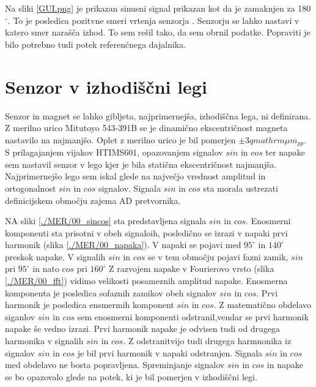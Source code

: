Na sliki  \ref{GUI.png} je prikazan sinusni signal prikazan kot da je zamaknjen za 180$\mathrm{^\circ}$. To je posledica pozitvne smeri vrtenja senzorja \cite{RM44}. Senzorju se lahko nastavi v katero smer narašča izhod. To sem rešil tako, da sem obrnil podatke. Popraviti je bilo potrebno tudi potek referenčnega dajalnika.
\section{Senzor v izhodiščni legi}
Senzor in magnet se lahko gibljeta, najprimernejša, izhodiščna lega, ni definirana. Z merilno urico Mitutoyo 543-391B se je dinamično ekscentričnost magneta nastavilo na najmanjšo. Oplet z merilno urico je bil pomerjen $\pm 3 qmathrm{\mu m_{pp}}$.
S prilagajanjem vijakov HTIMS601, opazovanjem signalov $sin$ in $cos$ ter napake sem nastavil senzor v lego kjer je bila statična ekscentričnost najmanjša. Najprimernejšo lego sem iskal glede na največjo vrednost amplitud in ortogonalnost  $sin$ in $cos$ signalov. Signala $sin$ in $cos$ sta morala ustrezati definicijskem območju zajema AD pretvornika.


NA sliki \ref{./MER/00_sincos} sta predstavljena signala $sin$ in $cos$. Enosmerni komponenti sta prisotni v obeh signaloih, posledično se izrazi v napaki prvi harmonik (slika \ref{./MER/00_napaka}).
V napaki se pojavi med $\mathrm{95^\circ}$ in $\mathrm{140^\circ}$ preskok napake. V signalih $sin$ in $cos$ se v tem območju pojavi fazni zamik, $sin$ pri $\mathrm{95^\circ}$ in nato $cos$ pri $\mathrm{160^\circ}$
Z razvojem napake v Fourierovo vrsto (slika \ref{./MER/00_fft}) vidimo velikosti posameznih amplitud napake.
Enosmerna komponenta je posledica sofaznih zamikov obeh signalov $sin$ in $cos$. 
Prvi harmonik je posledica ensmermih komponent $sin$ in $cos$. Z matematično obdelavo siganlov $sin$ in $cos$ sem enosmerni komponenti odstranil,vendar se prvi harmonik napake še vedno izrazi. Prvi harmonik napake je odvisen tudi od drugega harmonika v signalih $sin$ in $cos$.
Z odstranitvijo tudi drugega harmnonika iz signalov $sin$ in $cos$ je bil  prvi harmonik v napaki odstranjen.
Signala  $sin$ in $cos$ med obdelavo ne bosta popravljena. Spreminjanje signalov  $sin$ in $cos$ in napake se bo opazovalo glede na potek, ki je bil pomerjen v izhodiščni legi.

